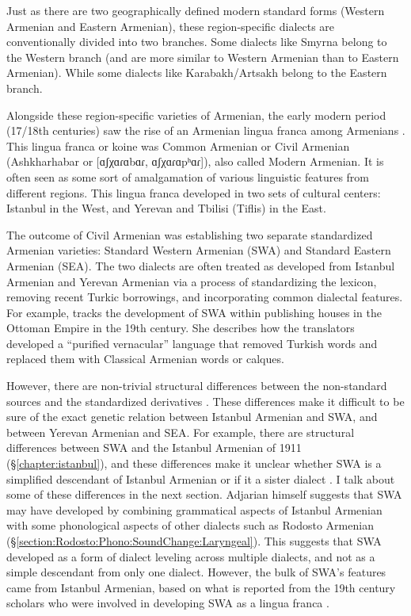 \documentclass[output=paper]{langscibook}
\begin{document}
Just as there are two geographically defined modern standard forms (Western Armenian and Eastern Armenian), these region-specific dialects are conventionally divided into two branches. Some dialects like Smyrna belong to the Western branch (and are more similar to Western Armenian than to Eastern Armenian). While some dialects like Karabakh/Artsakh belong to the Eastern branch. 

Alongside these region-specific varieties of Armenian, the early modern period (17/18th centuries) saw the rise of an Armenian lingua franca among Armenians \citep{Parnassian-1985-FormationAshkharabar,Donabedian-2018-WestArmTypoSocio}. This lingua franca or koine was Common Armenian or Civil Armenian (Ashkharhabar or  [ɑʃχɑɾɑbɑɾ, ɑʃχɑɾɑpʰɑɾ]), also called Modern Armenian. It is often seen as some sort of amalgamation of various linguistic features from different regions. This lingua franca developed in two sets of cultural centers: Istanbul in the West, and Yerevan and Tbilisi (Tiflis) in the East. 

The outcome of Civil Armenian was establishing two separate standardized Armenian varieties: Standard Western Armenian (SWA) and Standard Eastern Armenian (SEA). The two dialects are often treated as developed from Istanbul Armenian and Yerevan Armenian via a process of standardizing the lexicon, removing recent Turkic borrowings, and incorporating common dialectal features. For example, \citet{Manoukian-2022-LiteraryTranslationExpansionOttomanArmenian,Manoukian-2023-DissSearchPurityOttomanArmenian} tracks the development of SWA within publishing houses in the Ottoman Empire in the 19th century. She describes how the translators developed a “purified vernacular” language that removed Turkish words  and replaced them with Classical Armenian words or calques. 

However, there are non-trivial structural differences between the non\hyp standard sources and the standardized derivatives \citep{SayeedVaux-2017-EvolutionArmenian}. These differences make it difficult to be sure of the exact genetic relation between Istanbul Armenian and SWA, and between Yerevan Armenian and SEA. For example, there are structural differences between SWA and the Istanbul Armenian of 1911 (\S\ref{chapter:istanbul}), and these differences make it unclear whether SWA is a simplified descendant of Istanbul Armenian or if it a sister dialect  \citep[1148]{SayeedVaux-2017-EvolutionArmenian}. I talk about some of these differences in the next section. Adjarian himself suggests that SWA may have developed by combining grammatical aspects of Istanbul Armenian with some phonological aspects of other dialects such as Rodosto Armenian (\S\ref{section:Rodosto:Phono:SoundChange:Laryngeal}). This suggests that SWA developed as a form of dialect leveling across multiple dialects, and not as a simple descendant from only one dialect. However, the bulk of SWA's features  came from Istanbul Armenian, based on what is reported from the 19th century scholars who were involved in developing   SWA as a lingua franca \citep{Manoukian-2023-DissSearchPurityOttomanArmenian}.  
\end{document}
